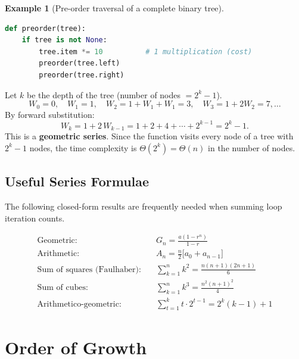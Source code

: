 \documentclass[11pt, a4paper, notitlepage]{report}
\theoremstyle{definition}
\theoremstyle{remark}
\theoremstyle{definition}
\newtheorem{example}[theorem]{Example}
\begin{document}
\begin{example}[Pre-order traversal of a complete binary tree]
\label{ex:preorder-traversal}
\leavevmode
\begin{lstlisting}[language=Python]
def preorder(tree):
    if tree is not None:
        tree.item *= 10          # 1 multiplication (cost)
        preorder(tree.left)
        preorder(tree.right)
\end{lstlisting}
Let $k$ be the depth of the tree (number of nodes $= 2^k - 1$).
\[
  W_0 = 0,\quad W_1 = 1,\quad W_2 = 1 + W_1 + W_1 = 3,\quad W_3 = 1 + 2W_2 = 7, \ldots
\]
By forward substitution:
\[
  W_k = 1 + 2\,W_{k-1} = 1 + 2 + 4 + \cdots + 2^{k-1} = 2^k - 1.
\]
This is a \textbf{geometric series}.  Since the function visits every node
of a tree with $2^k - 1$ nodes, the time complexity is $\Theta(2^k) = \Theta(n)$
in the number of nodes.
\end{example}

\subsection{Useful Series Formulae}
\label{subsec:series}

The following closed-form results are frequently needed when summing loop
iteration counts.

\begin{keyresult}[title={Key Series Formulae}]
\begin{align*}
  \text{Geometric:} &\quad G_n = \frac{a(1-r^n)}{1-r} \\[4pt]
  \text{Arithmetic:} &\quad A_n = \frac{n}{2}\bigl[a_0 + a_{n-1}\bigr] \\[4pt]
  \text{Sum of squares (Faulhaber):} &\quad \sum_{k=1}^{n} k^2 = \frac{n(n+1)(2n+1)}{6} \\[4pt]
  \text{Sum of cubes:} &\quad \sum_{k=1}^{n} k^3 = \frac{n^2(n+1)^2}{4} \\[4pt]
  \text{Arithmetico-geometric:} &\quad \sum_{t=1}^{k} t \cdot 2^{t-1} = 2^k(k-1)+1
\end{align*}
\end{keyresult}

\section{Order of Growth}
\label{sec:order-of-growth}
\end{document}
